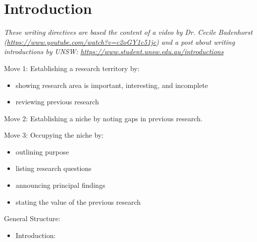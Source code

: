 \chapter{Introduction}
\label{chap:introduction}

\begin{writingdirectives}

      \item \textit{These writing directives are based the content of a video by
            Dr. Cecile Badenhorst
            (\url{https://www.youtube.com/watch?v=c2oGY1c51jc}) and a post about
            writing introductions by UNSW:
            \url{https://www.student.unsw.edu.au/introductions}}

      \item Move 1: Establishing a research territory by:
      \begin{itemize}

            \item showing research area is important, interesting, and
                  incomplete

            \item reviewing previous research

      \end{itemize}

      \item Move 2: Establishing a niche by noting gaps in previous research.

      \item Move 3: Occupying the niche by:
      \begin{itemize}

            \item outlining purpose

            \item listing research questions

            \item announcing principal findings

            \item stating the value of the previous research

      \end{itemize}

      \item General Structure:
      \begin{itemize}

            \item Introduction:
                  \begin{itemize}


\end{itemize}
\end{itemize}
\end{writingdirectives}
